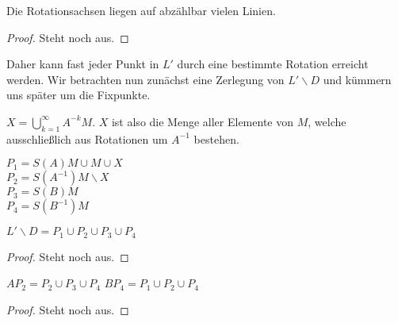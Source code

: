 \begin{lemma} \label{lemma:abz_rot_achsen}
Die Rotationsachsen liegen auf abzählbar vielen Linien.
\end{lemma}
\begin{proof} 
Steht noch aus.
\end{proof}


Daher kann fast jeder Punkt in $L'$ durch eine bestimmte Rotation erreicht werden. Wir betrachten nun zunächst eine 
Zerlegung von $L'\backslash D$ und kümmern uns später um die Fixpunkte.

\begin{definition}[Vereinigung X] \label{def:vereinigung_x} 
$X=\bigcup\limits_{k=1}^{\infty}A^{-k}M$. $X$ ist also die Menge aller Elemente von $M$, welche ausschließlich aus Rotationen
um $A^{-1}$ bestehen.
\leanok {}
\end{definition}

\begin{definition} \label{def:zerlegung_L_D} 
$P_1=S(A)M\cup M\cup X$ \\
$P_2=S(A^{-1})M\backslash X$ \\
$P_3=S(B)M$ \\
$P_4=S(B^{-1})M$ \\
\leanok
{}
\end{definition}

\begin{lemma} \label{lemma:vereinigung_zerlegung}
$L'\backslash D=P_1\cup P_2\cup P_3\cup P_4$
\leanok {}
\end{lemma}
\begin{proof} 
Steht noch aus.
\end{proof}

\begin{lemma} \label{lemma:rot_zerlegte_mengen}
$AP_2=P_2\cup P_3\cup P_4$
$BP_4=P_1\cup P_2\cup P_4$
\leanok {}
\end{lemma}
\begin{proof} 
Steht noch aus.
\end{proof}

